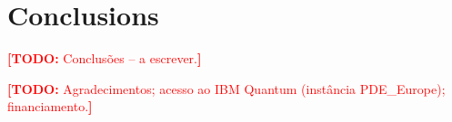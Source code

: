 \documentclass[floatfix,aps,pra,twocolumn,superscriptaddress,10pt,nofootinbib]{revtex4-2}
\newif\ifshowtodos \showtodostrue
\newcommand{\TODO}[1]{\ifshowtodos\textcolor{red}{\textbf{[TODO:} #1\textbf{]}}\fi}
\begin{document}
\section{Conclusions}\label{sec:conclusions}
\TODO{Conclus\~oes -- a escrever.}



\newpage
\begin{acknowledgments}
\TODO{Agradecimentos; acesso ao IBM Quantum (inst\^ancia PDE\_Europe); financiamento.}
\end{acknowledgments}
\end{document}
